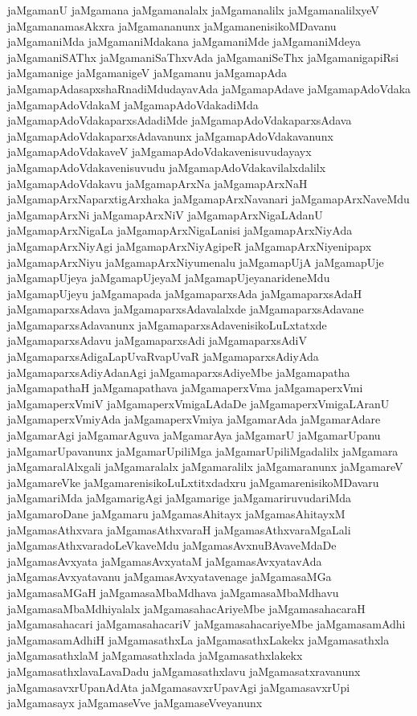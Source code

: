 {jaMgamanU
jaMgamana
jaMgamanalalx
jaMgamanalilx
jaMgamanalilxyeV
jaMgamanamasAkxra
jaMgamananunx
jaMgamanenisikoMDavanu
jaMgamaniMda
jaMgamaniMdakana
jaMgamaniMde
jaMgamaniMdeya
jaMgamaniSAThx
jaMgamaniSaThxvAda
jaMgamaniSeThx
jaMgamanigapiRsi
jaMgamanige
jaMgamanigeV
jaMgamanu
jaMgamapAda
jaMgamapAdasapxshaRnadiMdudayavAda
jaMgamapAdave
jaMgamapAdoVdaka
jaMgamapAdoVdakaM
jaMgamapAdoVdakadiMda
jaMgamapAdoVdakaparxsAdadiMde
jaMgamapAdoVdakaparxsAdava
jaMgamapAdoVdakaparxsAdavanunx
jaMgamapAdoVdakavanunx
jaMgamapAdoVdakaveV
jaMgamapAdoVdakavenisuvudayayx
jaMgamapAdoVdakavenisuvudu
jaMgamapAdoVdakavilalxdalilx
jaMgamapAdoVdakavu
jaMgamapArxNa
jaMgamapArxNaH
jaMgamapArxNaparxtigArxhaka
jaMgamapArxNavanari
jaMgamapArxNaveMdu
jaMgamapArxNi
jaMgamapArxNiV
jaMgamapArxNigaLAdanU
jaMgamapArxNigaLa
jaMgamapArxNigaLanisi
jaMgamapArxNiyAda
jaMgamapArxNiyAgi
jaMgamapArxNiyAgipeR
jaMgamapArxNiyenipapx
jaMgamapArxNiyu
jaMgamapArxNiyumenalu
jaMgamapUjA
jaMgamapUje
jaMgamapUjeya
jaMgamapUjeyaM
jaMgamapUjeyanarideneMdu
jaMgamapUjeyu
jaMgamapada
jaMgamaparxsAda
jaMgamaparxsAdaH
jaMgamaparxsAdava
jaMgamaparxsAdavalalxde
jaMgamaparxsAdavane
jaMgamaparxsAdavanunx
jaMgamaparxsAdavenisikoLuLxtatxde
jaMgamaparxsAdavu
jaMgamaparxsAdi
jaMgamaparxsAdiV
jaMgamaparxsAdigaLapUvaRvapUvaR
jaMgamaparxsAdiyAda
jaMgamaparxsAdiyAdanAgi
jaMgamaparxsAdiyeMbe
jaMgamapatha
jaMgamapathaH
jaMgamapathava
jaMgamaperxVma
jaMgamaperxVmi
jaMgamaperxVmiV
jaMgamaperxVmigaLAdaDe
jaMgamaperxVmigaLAranU
jaMgamaperxVmiyAda
jaMgamaperxVmiya
jaMgamarAda
jaMgamarAdare
jaMgamarAgi
jaMgamarAguva
jaMgamarAya
jaMgamarU
jaMgamarUpanu
jaMgamarUpavanunx
jaMgamarUpiliMga
jaMgamarUpiliMgadalilx
jaMgamara
jaMgamaralAlxgali
jaMgamaralalx
jaMgamaralilx
jaMgamaranunx
jaMgamareV
jaMgamareVke
jaMgamarenisikoLuLxtitxdadxru
jaMgamarenisikoMDavaru
jaMgamariMda
jaMgamarigAgi
jaMgamarige
jaMgamariruvudariMda
jaMgamaroDane
jaMgamaru
jaMgamasAhitayx
jaMgamasAhitayxM
jaMgamasAthxvara
jaMgamasAthxvaraH
jaMgamasAthxvaraMgaLali
jaMgamasAthxvaradoLeVkaveMdu
jaMgamasAvxnuBAvaveMdaDe
jaMgamasAvxyata
jaMgamasAvxyataM
jaMgamasAvxyatavAda
jaMgamasAvxyatavanu
jaMgamasAvxyatavenage
jaMgamasaMGa
jaMgamasaMGaH
jaMgamasaMbaMdhava
jaMgamasaMbaMdhavu
jaMgamasaMbaMdhiyalalx
jaMgamasahacAriyeMbe
jaMgamasahacaraH
jaMgamasahacari
jaMgamasahacariV
jaMgamasahacariyeMbe
jaMgamasamAdhi
jaMgamasamAdhiH
jaMgamasathxLa
jaMgamasathxLakekx
jaMgamasathxla
jaMgamasathxlaM
jaMgamasathxlada
jaMgamasathxlakekx
jaMgamasathxlavaLavaDadu
jaMgamasathxlavu
jaMgamasatxravanunx
jaMgamasavxrUpanAdAta
jaMgamasavxrUpavAgi
jaMgamasavxrUpi
jaMgamasayx
jaMgamaseVve
jaMgamaseVveyanunx
}
